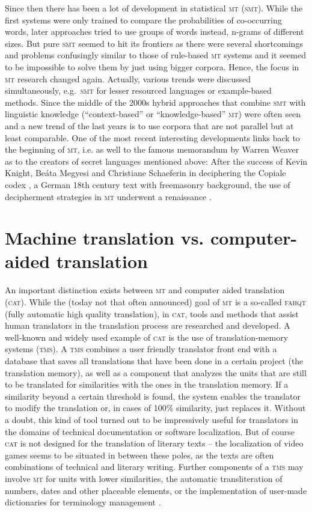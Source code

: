 \documentclass[output=paper]{LSP/langsci}
\begin{document}
\newpage  
Since then there has been a lot of development in statistical \textsc{mt} (\textsc{smt}). While the first systems were only trained to compare the probabilities of co-occurring words, later approaches tried to use groups of words instead, n-grams of different sizes. But pure \textsc{smt} seemed to hit its frontiers as there were several shortcomings and problems confusingly similar to those of rule-based \textsc{mt} systems and it seemed to be impossible to solve them by just using bigger corpora. Hence, the focus in \textsc{mt} research changed again. Actually, various trends were discussed simultaneously, e.g.\ \textsc{smt} for lesser resourced languages or example-based methods. Since the middle of the 2000s hybrid approaches that combine \textsc{smt} with linguistic knowledge (``context-based'' or ``knowledge-based'' \textsc{mt}) were often seen and a new trend of the last years is to use corpora that are not parallel but at least comparable. One of the most recent interesting developments links back to the beginning of \textsc{mt}, i.e. as well to the famous memorandum by Warren Weaver as to the creators of secret languages mentioned above: After the success of Kevin Knight, Beáta Megyesi and Christiane Schaeferin in deciphering the Copiale codex \citep{Knight2012}, a German 18th century text with freemasonry background, the use of decipherment strategies in \textsc{mt} underwent a renaissance \citep{Dou2012}.

\section{Machine translation vs. computer-aided translation}\label{sec:stein:2} 
An important distinction exists between \textsc{mt} and computer aided translation (\textsc{cat}). While the (today not that often announced) goal of \textsc{mt} is a so-called \textsc{fahqt} (fully automatic high quality translation), in \textsc{cat}, tools and methods that assist human translators in the translation process are researched and developed. A well-known and widely used example of \textsc{cat} is the use of translation-memory systems (\textsc{tms}). A \textsc{tms} combines a user friendly translator front end with a database that saves all translations that have been done in a certain project (the translation memory), as well as a component that analyzes the units that are still to be translated for similarities with the ones in the translation memory. If a similarity beyond a certain threshold is found, the system enables the translator to modify the translation or, in cases of 100\% similarity, just replaces it. Without a doubt, this kind of tool turned out to be impressively useful for translators in the domains of technical documentation or software localization. But of course \textsc{cat} is not designed for the translation of literary texts -- the localization of video games seems to be situated in between these poles, as the texts are often combinations of technical and literary writing. Further components of a \textsc{tms} may involve \textsc{mt} for units with lower similarities, the automatic transliteration of numbers, dates and other placeable elements, or the implementation of user-made dictionaries for terminology management \citep{Seewald-Heeg2002}.
\end{document}
